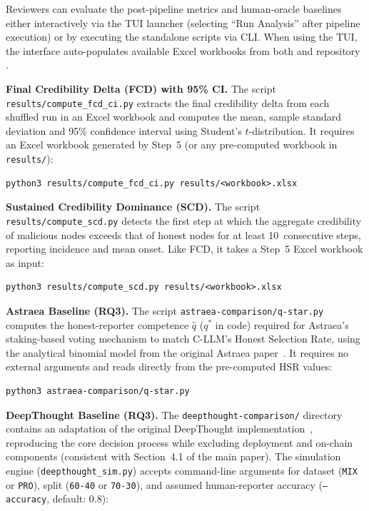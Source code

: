 Reviewers can evaluate the post-pipeline metrics and human-oracle baselines either interactively via the TUI launcher (selecting ``Run Analysis'' after pipeline execution) or by executing the standalone scripts via CLI. When using the TUI, the interface auto-populates available Excel workbooks from both  and repository .

\smallskip\noindent\textbf{Final Credibility Delta (FCD) with 95\% CI.} The script \texttt{results/compute\_fcd\_ci.py} extracts the final credibility delta from each shuffled run in an Excel workbook and computes the mean, sample standard deviation and 95\% confidence interval using Student's $t$-distribution. It requires an Excel workbook generated by Step~5 (or any pre-computed workbook in \texttt{results/}):

\begin{lstlisting}[style=shell]
python3 results/compute_fcd_ci.py results/<workbook>.xlsx
\end{lstlisting}

\smallskip\noindent\textbf{Sustained Credibility Dominance (SCD).} The script \texttt{results/compute\_scd.py} detects the first step at which the aggregate credibility of malicious nodes exceeds that of honest nodes for at least 10~consecutive steps, reporting incidence and mean onset. Like FCD, it takes a Step~5 Excel workbook as input:

\begin{lstlisting}[style=shell]
python3 results/compute_scd.py results/<workbook>.xlsx
\end{lstlisting}

\smallskip\noindent\textbf{Astraea Baseline (RQ3).} The script \texttt{astraea-comparison/q-star.py} computes the honest-reporter competence $\hat{q}$ ($q^*$ in code) required for Astraea's staking-based voting mechanism to match C-LLM's Honest Selection Rate, using the analytical binomial model from the original Astraea paper~\cite{adler2018astraea}. It requires no external arguments and reads directly from the pre-computed HSR values:

\begin{lstlisting}[style=shell]
python3 astraea-comparison/q-star.py
\end{lstlisting}

\smallskip\noindent\textbf{DeepThought Baseline (RQ3).} The \texttt{deepthought-comparison/} directory contains an adaptation of the original DeepThought implementation~\cite{di2022deepthought}, reproducing the core decision process while excluding deployment and on-chain components (consistent with Section~4.1 of the main paper). The simulation engine (\texttt{deepthought\_sim.py}) accepts command-line arguments for dataset (\texttt{MIX} or \texttt{PRO}), split (\texttt{60-40} or \texttt{70-30}), and assumed human-reporter accuracy (\texttt{--accuracy}, default: $0.8$):

